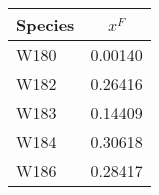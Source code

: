 \begin{tabular}{|l||c|}
\hline
\bf{Species} & \bf{$x^F$} \\ 
\hline
W180 & 0.00140 \\ 
\hline
W182 & 0.26416 \\ 
\hline
W183 & 0.14409 \\ 
\hline
W184 & 0.30618 \\ 
\hline
W186 & 0.28417 \\ 
\hline
\end{tabular}
